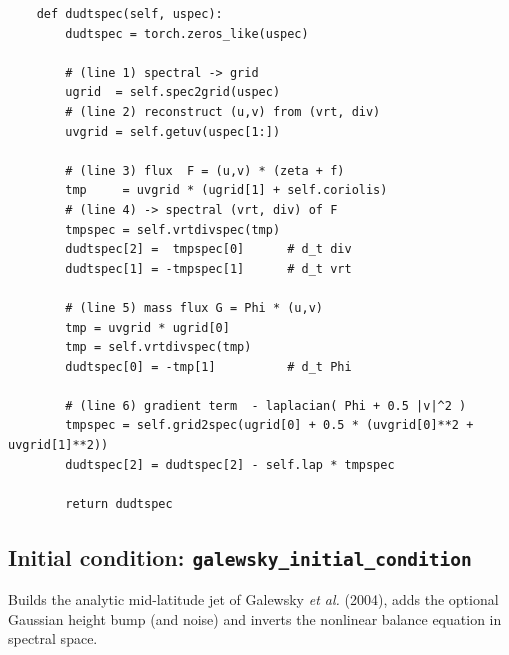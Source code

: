 \documentclass[11pt]{article}
\begin{document}
\begin{lstlisting}
    def dudtspec(self, uspec):
        dudtspec = torch.zeros_like(uspec)

        # (line 1) spectral -> grid
        ugrid  = self.spec2grid(uspec)
        # (line 2) reconstruct (u,v) from (vrt, div)
        uvgrid = self.getuv(uspec[1:])

        # (line 3) flux  F = (u,v) * (zeta + f)
        tmp     = uvgrid * (ugrid[1] + self.coriolis)
        # (line 4) -> spectral (vrt, div) of F
        tmpspec = self.vrtdivspec(tmp)
        dudtspec[2] =  tmpspec[0]      # d_t div
        dudtspec[1] = -tmpspec[1]      # d_t vrt

        # (line 5) mass flux G = Phi * (u,v)
        tmp = uvgrid * ugrid[0]
        tmp = self.vrtdivspec(tmp)
        dudtspec[0] = -tmp[1]          # d_t Phi

        # (line 6) gradient term  - laplacian( Phi + 0.5 |v|^2 )
        tmpspec = self.grid2spec(ugrid[0] + 0.5 * (uvgrid[0]**2 + uvgrid[1]**2))
        dudtspec[2] = dudtspec[2] - self.lap * tmpspec

        return dudtspec
\end{lstlisting}

\subsection{Initial condition: \texttt{galewsky\_initial\_condition}}

Builds the analytic mid-latitude jet of Galewsky \emph{et al.} (2004),
adds the optional Gaussian height bump (and noise) and inverts the
nonlinear balance equation in spectral space.
\end{document}
